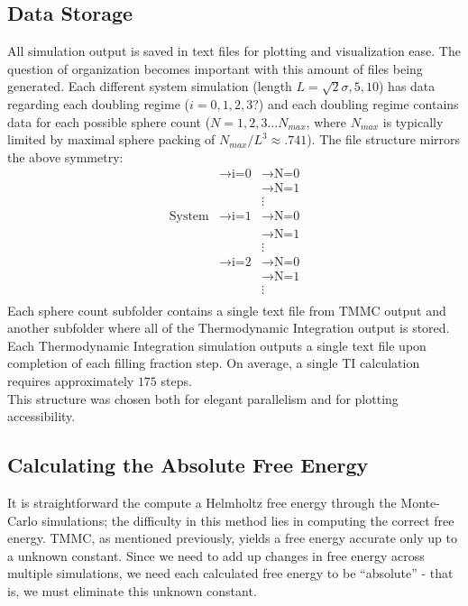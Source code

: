 \documentclass[12pt]{article}
\begin{document}
\subsection{Data Storage}
All simulation output is saved in text files for plotting and visualization ease. The question of organization becomes important with this amount of files being generated. Each different system simulation (length $L = \sqrt2 \sigma, 5,10$) has data regarding each doubling regime ($i=0,1,2,3?$) and each doubling regime contains data for each possible sphere count ($N=1,2,3\dots N_{max}$, where $N_{max}$ is typically limited by maximal sphere packing of $N_{max}/L^3\approx.741$). The file structure mirrors the above symmetry: 
\begin{align*}
                &\rightarrow \text{i=0} &\rightarrow \text{N=0}\\
                & &\rightarrow \text{N=1}\\
                && \vdots\\
\text{System} & \rightarrow \text{i=1} &\rightarrow \text{N=0}\\
                && \rightarrow \text{N=1}\\
                &&\vdots\\
                &\rightarrow \text{i=2} &\rightarrow \text{N=0}\\
                && \rightarrow \text{N=1}\\
                &&\vdots\\
\end{align*}
Each sphere count subfolder contains a single text file from TMMC output and another subfolder where all of the Thermodynamic Integration output is stored. Each Thermodynamic Integration simulation outputs a single text file upon completion of each filling fraction step. On average, a single TI calculation requires approximately $175$ steps. \\
This structure was chosen both for elegant parallelism and for plotting accessibility. 

\subsection{Calculating the Absolute Free Energy}
It is straightforward the compute a Helmholtz free energy through the Monte-Carlo simulations; the difficulty in this method lies in computing the correct free energy. TMMC, as mentioned previously, yields a free energy accurate only up to a unknown constant. Since we need to add up changes in free energy across multiple simulations, we need each calculated free energy to be ``absolute'' - that is, we must eliminate this unknown constant. \\
\end{document}
